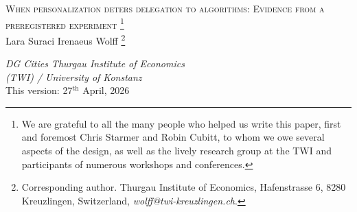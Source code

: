 \documentclass[a4paper, 12pt, fleqn]{article}
\title{\mytitle}
\date{}
\theoremstyle{definition}
\newcommand{\symbolfootnote}[1]{\begingroup%
\renewcommand{\thefootnote}{\fnsymbol{footnote}}\footnote{#1}\endgroup}
\newcommand{\mytitle}{{\Large \textsc{When personalization deters delegation to algorithms: Evidence from a preregistered experiment}}}
\begin{document}
 
\thispagestyle{empty}
\begin{center}
	\mytitle\symbolfootnote{We are grateful to all the many people who helped us write this paper, first and foremost Chris Starmer and Robin Cubitt, to whom we owe several aspects of the design, as well as the lively research group at the TWI and participants of numerous workshops and conferences.}
  \vspace{.55cm}\\
 Lara Suraci \qquad\qquad\qquad Irenaeus Wolff\symbolfootnote{Corresponding author. Thurgau Institute of Economics, Hafenstrasse 6, 8280 Kreuzlingen, Switzerland, \textit{wolff@twi-kreuzlingen.ch}.}
\\\vspace{.25cm}
 \begin{small}
  \phantom{mortext}\textit{DG Cities \qquad\qquad Thurgau Institute of Economics \\ \phantom{moretext}\phantom{University} \qquad\qquad (TWI) / University of Konstanz} %
  \vspace{.03cm}\\
\vspace{.6cm}
 {This version: 27$^{\text{th}}$ April, 2026}
\vspace{.6cm}
\end{small}
\end{center}
\end{document}
